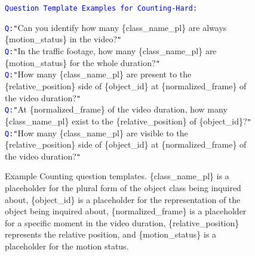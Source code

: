 \begin{figure*}[htbp]
\begin{tcolorbox}[colback=gray!10,%
	colframe=black,%
	width=\textwidth,
	arc=1mm, auto outer arc,
	boxrule=0.5pt,
	]
  	\texttt{\textcolor{blue}{Question Template Examples for Counting-Hard:}}
   
	\texttt{\textcolor{blue}{Q:}}\texttt{"}Can you identify how many \mbox{\{class\_name\_pl\}} are always \mbox{\{motion\_status\}} in the video?\texttt{"}\\
        \texttt{\textcolor{blue}{Q:}}\texttt{"}In the traffic footage, how many \mbox{\{class\_name\_pl\}} are \mbox{\{motion\_status\}} for the whole duration?\texttt{"}\\
        \texttt{\textcolor{blue}{Q:}}\texttt{"}How many \mbox{\{class\_name\_pl\}} are present to the \mbox{\{relative\_position\}} side of \mbox{\{object\_id\}} at \mbox{\{normalized\_frame\}} of the video duration?\texttt{"}\\
        \texttt{\textcolor{blue}{Q:}}\texttt{"}At \mbox{\{normalized\_frame\}} of the video duration, how many \mbox{\{class\_name\_pl\}} exist to the \mbox{\{relative\_position\}} of \mbox{\{object\_id\}}?\texttt{"}\\
        \texttt{\textcolor{blue}{Q:}}\texttt{"}How many \mbox{\{class\_name\_pl\}} are visible to the \mbox{\{relative\_position\}} side of \mbox{\{object\_id\}} at \mbox{\{normalized\_frame\}} of the video duration?\texttt{"}\\

\end{tcolorbox}
\caption{Example Counting question templates. \mbox{\{class\_name\_pl\}} is a placeholder for the plural form of the object class being inquired about, \mbox{\{object\_id\}} is a placeholder for the representation of the object being inquired about, \mbox{\{normalized\_frame\}} is a placeholder for a specific moment in the video duration, \mbox{\{relative\_position\}} represents the relative position, and \mbox{\{motion\_status\}} is a placeholder for the motion status.}
\label{fig:counting_qa_templates}
\end{figure*}


